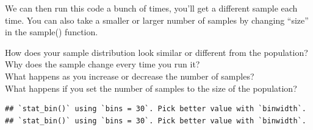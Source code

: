 \documentclass[
]{book}
\newenvironment{Shaded}{\begin{snugshade}}{\end{snugshade}}
\newcommand{\AttributeTok}[1]{\textcolor[rgb]{0.77,0.63,0.00}{#1}}
\newcommand{\ConstantTok}[1]{\textcolor[rgb]{0.00,0.00,0.00}{#1}}
\newcommand{\DecValTok}[1]{\textcolor[rgb]{0.00,0.00,0.81}{#1}}
\newcommand{\FunctionTok}[1]{\textcolor[rgb]{0.00,0.00,0.00}{#1}}
\newcommand{\NormalTok}[1]{#1}
\newcommand{\OtherTok}[1]{\textcolor[rgb]{0.56,0.35,0.01}{#1}}
\newcommand{\SpecialCharTok}[1]{\textcolor[rgb]{0.00,0.00,0.00}{#1}}
\newcommand{\StringTok}[1]{\textcolor[rgb]{0.31,0.60,0.02}{#1}}
\begin{document}
We can then run this code a bunch of times, you'll get a different sample each time. You can also take a smaller or larger number of samples by changing ``size'' in the sample() function.

How does your sample distribution look similar or different from the population?\\
Why does the sample change every time you run it?\\
What happens as you increase or decrease the number of samples?\\
What happens if you set the number of samples to the size of the population?

\begin{Shaded}
\end{Shaded}

\begin{verbatim}
## `stat_bin()` using `bins = 30`. Pick better value with `binwidth`.
## `stat_bin()` using `bins = 30`. Pick better value with `binwidth`.
\end{verbatim}
\end{document}

